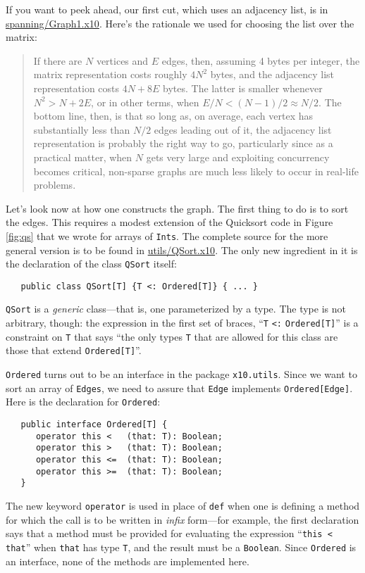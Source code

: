 If you want to peek ahead, our first cut, which uses an adjacency list, is in
\href{http://dist.codehaus.org/x10/documentation/guide/src/spanning/Graph1.x10}{spanning/Graph1.x10}.
Here's the rationale we used for choosing the list over the matrix:
\begin{quote}
If there are $N$ vertices and $E$ edges, then, assuming 4 bytes per integer, the
matrix representation costs roughly $4N^2$ bytes, and the adjacency list
representation costs $4N+8E$ bytes.  The latter is smaller whenever
$N^2 > N + 2E$, or in other terms, when $E/N < (N - 1)/2 \approx N/2$. The
bottom line, then, is that so long as, on average, each vertex has substantially
less than $N/2$ edges leading out of it, the adjacency list representation is
probably the right way to go, particularly since as a practical matter, when
$N$ gets very large and exploiting concurrency becomes critical,
non-sparse graphs are much less likely to occur in real-life problems.
\end{quote}
Let's look now at how one constructs the graph.  The first thing to do is to
sort the edges.  This requires a modest extension of the Quicksort code in
Figure \ref{fig:qs} that we wrote for arrays of {\tt Ints}.  The complete
source for the more general version is to be found in
\href{http://dist.codehaus.org/x10/documentation/guide/src/utils/QSort.x10}{utils/QSort.x10}.
The only new ingredient in it is the declaration of the class {\tt QSort}
itself:
\begin{verbatim}
   public class QSort[T] {T <: Ordered[T]} { ... }
\end{verbatim}
{\tt QSort} is a {\em generic} class---that is, one parameterized by a type. The
type is not arbitrary, though: the expression in the first set of braces, ``{\tt T}
{\tt <:}  {\tt Ordered[T]}'' is a constraint on {\tt T} that says ``the only types
{\tt T} that are allowed for this class are those that extend
{\tt Ordered[T]}''.

{\tt Ordered} turns out to be an interface in the package {\tt x10.utils}.
Since we want to sort an array of {\tt Edges}, we need to assure that {\tt Edge}
implements {\tt Ordered[Edge]}.  Here is the declaration for {\tt Ordered}:
\begin{verbatim}
   public interface Ordered[T] {
      operator this <   (that: T): Boolean;
      operator this >   (that: T): Boolean;
      operator this <=  (that: T): Boolean;
      operator this >=  (that: T): Boolean;
   }      
\end{verbatim}
The new keyword {\tt operator} is used in place of {\tt def} when one is
defining a method for which the call is to be written in
{\em infix} form---for example, the first declaration says that a method must be
provided for evaluating the expression ``{\tt this < that}'' when {\tt that} has
type {\tt T}, and the result must be a {\tt Boolean}.  Since {\tt Ordered} is an
interface, none of the methods are implemented here. 

